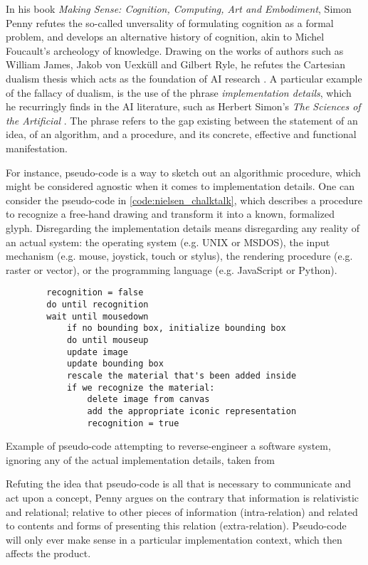 In his book \emph{Making Sense: Cognition, Computing, Art and Embodiment}, Simon Penny refutes the so-called unversality of formulating cognition as a formal problem, and develops an alternative history of cognition, akin to Michel Foucault's archeology of knowledge. Drawing on the works of authors such as William James, Jakob von Uexküll and Gilbert Ryle, he refutes the Cartesian dualism thesis which acts as the foundation of AI research \citep{penny_making_2019}. A particular example of the fallacy of dualism, is the use of the phrase \emph{implementation details}, which he recurringly finds in the AI literature, such as Herbert Simon's \emph{The Sciences of the Artificial} \citep{simon_sciences_1996}. The phrase refers to the gap existing between the statement of an idea, of an algorithm, and a procedure, and its concrete, effective and functional manifestation.

For instance, pseudo-code is a way to sketch out an algorithmic procedure, which might be considered agnostic when it comes to implementation details. One can consider the pseudo-code in \ref{code:nielsen_chalktalk}, which describes a procedure to recognize a free-hand drawing and transform it into a known, formalized glyph. Disregarding the implementation details means disregarding any reality of an actual system: the operating system (e.g. UNIX or MSDOS), the input mechanism (e.g. mouse, joystick, touch or stylus), the rendering procedure (e.g. raster or vector), or the programming language (e.g. JavaScript or Python).

\begin{listing}
    \begin{verbatim}
        recognition = false
        do until recognition
        wait until mousedown
            if no bounding box, initialize bounding box
            do until mouseup
            update image
            update bounding box
            rescale the material that's been added inside
            if we recognize the material:
                delete image from canvas
                add the appropriate iconic representation
                recognition = true
    \end{verbatim}
    \caption[]{Example of pseudo-code attempting to reverse-engineer a software system, ignoring any of the actual implementation details, taken from \citep{nielsen_working_2017}}
    \label{code:nielsen_chalktalk}
\end{listing}

Refuting the idea that pseudo-code is all that is necessary to communicate and act upon a concept, Penny  argues on the contrary that information is relativistic and relational; relative to other pieces of information (intra-relation) and related to contents and forms of presenting this relation (extra-relation). Pseudo-code will only ever make sense in a particular implementation context, which then affects the product.

